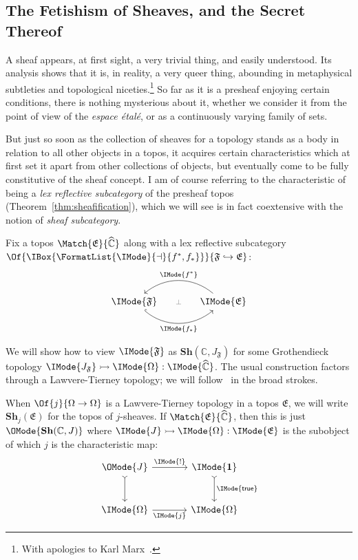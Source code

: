 \documentclass{article}
\newcommand\Psh[1]{\widehat{#1}}
\newcommand\Sh[1]{\mathbf{Sh} (#1)}
\newcommand\IsSubobject[3]{\IMode{#1}\rightarrowtail\IMode{#2}:\IMode{#3}}
\newcommand\One{\mathbf{1}}
\newcommand\AreAdjoint[1]{\FormatList{\IMode}{\dashv}{#1}}
\newcommand\True{\mathsf{true}}
\begin{document}
\subsection{The Fetishism of Sheaves, and the Secret Thereof}

A sheaf appears, at first sight, a very trivial thing, and easily
understood. Its analysis shows that it is, in reality, a very queer
thing, abounding in metaphysical subtleties and topological
niceties.\footnote{With apologies to Karl
  Marx~\cite{marx:capital-vol-1}.} So far as it is a presheaf enjoying
certain conditions, there is nothing mysterious about it, whether we
consider it from the point of view of the \emph{espace \'etal\'e}, or
as a continuously varying family of sets.

But just so soon as the collection of sheaves for a topology stands as
a body in relation to all other objects in a topos, it acquires
certain characteristics which at first set it apart from other
collections of objects, but eventually come to be fully constitutive
of the sheaf concept. I am of course referring to the characteristic
of being a \emph{lex reflective subcategory} of the presheaf topos
(Theorem~\ref{thm:sheafification}), which we will see is in fact
coextensive with the notion of \emph{sheaf subcategory}.

Fix a topos $\Match{\mathfrak{E}}{\Psh{\mathbb{C}}}$ along with a lex reflective subcategory
$\Of{\IBox{\AreAdjoint{f^*,f_*}}}{\mathfrak{F}\hookrightarrow\mathfrak{E}}$:
\[
  \begin{tikzcd}[sep=large]
    \IMode{\mathfrak{F}}
    \arrow[r,phantom,"{\color{gray}\scriptstyle\bot}"]
    \arrow[r,hook,swap,bend right=40,"\IMode{f_*}"]
    &
    \IMode{\mathfrak{E}}
    \arrow[l,swap,bend right=40,"\IMode{f^*}"]
  \end{tikzcd}%
\]

We will show how to view $\IMode{\mathfrak{F}}$ as
$\Sh{\mathbb{C},J_{\mathfrak{F}}}$ for some Grothendieck topology
$\IsSubobject{J_{\mathfrak{F}}}{\Omega}{\Psh{\mathbb{C}}}$. The usual
construction factors through a Lawvere-Tierney topology; we will
follow~\cite{maclane-moerdijk:1992} in the broad strokes.

\newcommand\LTSh[2]{\mathbf{Sh}_{#1} (#2)}

\begin{notation}
  When $\Of{j}{\Omega\to\Omega}$ is a Lawvere-Tierney topology in a
  topos $\mathfrak{E}$, we will write $\LTSh{j}{\mathfrak{E}}$ for the
  topos of $j$-sheaves. If $\Match{\mathfrak{E}}{\Psh{\mathbb{C}}}$,
  then this is just $\OMode{\Sh{\mathbb{C},J}}$ where
  $\IsSubobject{J}{\Omega}{\mathfrak{E}}$ is the subobject of which
  $j$ is the characteristic map:
  \[
    \begin{tikzcd}[sep=large]
      \OMode{J}
      \arrow[r,"\IMode{!}"]
      \arrow[d,tail]
      &
      \IMode{\One}
      \arrow[d,tail,"\IMode{\True}"]
      \\
      \IMode{\Omega}
      \arrow[r,swap,"\IMode{j}"]
      &
      \IMode{\Omega}
    \end{tikzcd}
  \]
\end{notation}
\end{document}
